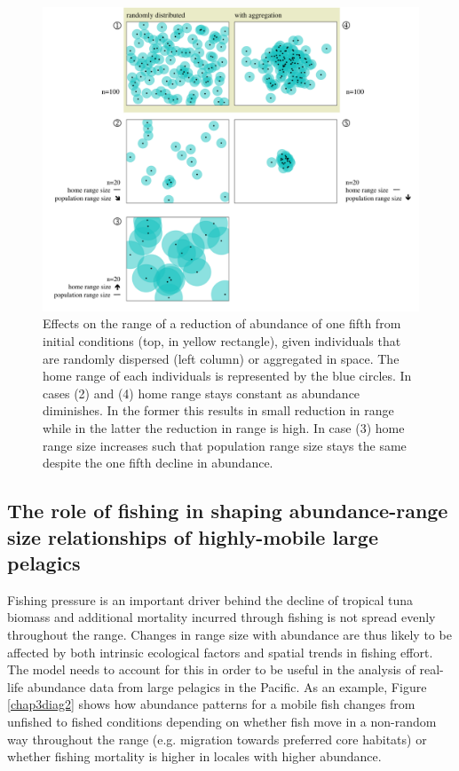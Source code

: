 \documentclass{article}
\begin{document}
\begin{figure}[!h]
\label{lili}
\begin{center}
\includegraphics[scale=0.75]{PhD_ResearchProposal_DiagramAreaAbundanceHomeRange2.png}
\caption{Effects on the range of a reduction of abundance of one fifth from
  initial conditions (top, in yellow rectangle), given individuals
  that are randomly dispersed (left column) or aggregated in
  space. The home range of each individuals is represented by the blue
  circles. In cases (2) and (4) home range stays constant as abundance
  diminishes. In the former this results in small reduction in range
  while in the latter the reduction in range is high. In case (3) home
  range size increases such that population range size stays the same
  despite the one fifth decline in abundance.}
\end{center}
\end{figure}

\subsection{The role of fishing in shaping abundance-range size relationships
 of highly-mobile large pelagics}

Fishing pressure is an important driver behind the decline of tropical
tuna biomass and additional mortality incurred through fishing
is not spread evenly throughout the range. Changes in range size with
abundance are thus likely to be affected by both intrinsic
ecological factors and spatial trends in fishing effort. The model
needs to account for this in order to be useful in the analysis of
real-life abundance data from large pelagics in the Pacific. As an
example, Figure
\ref{chap3diag2} shows how abundance patterns for a mobile
fish changes from unfished to fished conditions depending on whether
fish move in a non-random way throughout the range (e.g. migration
towards preferred core habitats) or whether fishing mortality is
higher in locales with higher abundance.
\end{document}
